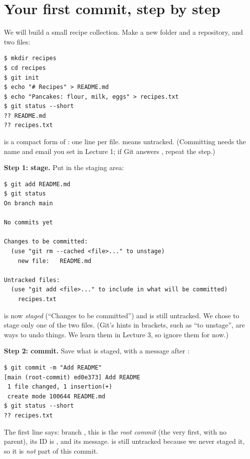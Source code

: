\section{Your first commit, step by step}

We will build a small recipe collection. Make a new folder and a repository, and two files:

\begin{lstlisting}
$ mkdir recipes
$ cd recipes
$ git init
$ echo "# Recipes" > README.md
$ echo "Pancakes: flour, milk, eggs" > recipes.txt
$ git status --short
?? README.md
?? recipes.txt
\end{lstlisting}

 is a compact form of : one line per file.  means untracked. (Committing needs the name and email you set in Lecture 1; if Git answers , repeat the  step.)

\textbf{Step 1: stage.} Put  in the staging area:

\begin{lstlisting}
$ git add README.md
$ git status
On branch main

No commits yet

Changes to be committed:
  (use "git rm --cached <file>..." to unstage)
	new file:   README.md

Untracked files:
  (use "git add <file>..." to include in what will be committed)
	recipes.txt
\end{lstlisting}

 is now \emph{staged} (``Changes to be committed'') and  is still untracked. We chose to stage only one of the two files. (Git's hints in brackets, such as ``to unstage'', are ways to undo things. We learn them in Lecture 3, so ignore them for now.)

\textbf{Step 2: commit.} Save what is staged, with a message after :

\begin{lstlisting}
$ git commit -m "Add README"
[main (root-commit) ed0e373] Add README
 1 file changed, 1 insertion(+)
 create mode 100644 README.md
$ git status --short
?? recipes.txt
\end{lstlisting}

The first line says: branch , this is the \emph{root commit} (the very first, with no parent), its ID is , and its message.  is still untracked because we never staged it, so it is \emph{not} part of this commit.

